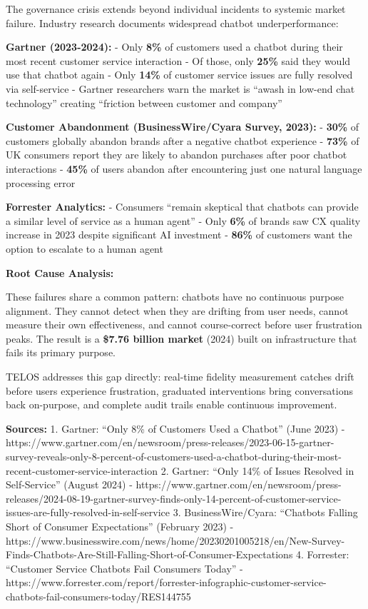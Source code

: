 The governance crisis extends beyond individual incidents to systemic
market failure. Industry research documents widespread chatbot
underperformance:

\textbf{Gartner (2023-2024):} - Only \textbf{8\%} of customers used a
chatbot during their most recent customer service interaction - Of
those, only \textbf{25\%} said they would use that chatbot again - Only
\textbf{14\%} of customer service issues are fully resolved via
self-service - Gartner researchers warn the market is ``awash in low-end
chat technology'' creating ``friction between customer and company''

\textbf{Customer Abandonment (BusinessWire/Cyara Survey, 2023):} -
\textbf{30\%} of customers globally abandon brands after a negative
chatbot experience - \textbf{73\%} of UK consumers report they are
likely to abandon purchases after poor chatbot interactions -
\textbf{45\%} of users abandon after encountering just one natural
language processing error

\textbf{Forrester Analytics:} - Consumers ``remain skeptical that
chatbots can provide a similar level of service as a human agent'' -
Only \textbf{6\%} of brands saw CX quality increase in 2023 despite
significant AI investment - \textbf{86\%} of customers want the option
to escalate to a human agent

\textbf{Root Cause Analysis:}

These failures share a common pattern: chatbots have no continuous
purpose alignment. They cannot detect when they are drifting from user
needs, cannot measure their own effectiveness, and cannot course-correct
before user frustration peaks. The result is a \textbf{\$7.76 billion
market} (2024) built on infrastructure that fails its primary purpose.

TELOS addresses this gap directly: real-time fidelity measurement
catches drift before users experience frustration, graduated
interventions bring conversations back on-purpose, and complete audit
trails enable continuous improvement.

\textbf{Sources:} 1. Gartner: ``Only 8\% of Customers Used a Chatbot''
(June 2023) -
https://www.gartner.com/en/newsroom/press-releases/2023-06-15-gartner-survey-reveals-only-8-percent-of-customers-used-a-chatbot-during-their-most-recent-customer-service-interaction
2. Gartner: ``Only 14\% of Issues Resolved in Self-Service'' (August
2024) -
https://www.gartner.com/en/newsroom/press-releases/2024-08-19-gartner-survey-finds-only-14-percent-of-customer-service-issues-are-fully-resolved-in-self-service
3. BusinessWire/Cyara: ``Chatbots Falling Short of Consumer
Expectations'' (February 2023) -
https://www.businesswire.com/news/home/20230201005218/en/New-Survey-Finds-Chatbots-Are-Still-Falling-Short-of-Consumer-Expectations
4. Forrester: ``Customer Service Chatbots Fail Consumers Today'' -
https://www.forrester.com/report/forrester-infographic-customer-service-chatbots-fail-consumers-today/RES144755

